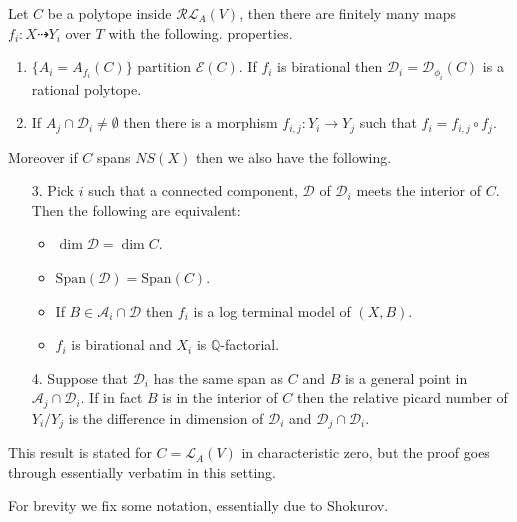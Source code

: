 	\begin{theorem}\label{assumptions}\cite[Theorem 3.3]{hacon2009sarkisov}
		Let $C$ be a polytope inside $\mathcal{RL}_{A}(V)$, then there are finitely many maps $f_{i}:X \dashrightarrow Y_{i}$ over $T$ with the following. properties.
		
		\begin{enumerate}
			\item $\{A_{i}=A_{f_{i}}(C)\}$ partition $\mathcal{E}(C)$. If $f_{i}$ is birational then $\mathcal{D}_{i}=\mathcal{D}_{\phi_{i}}(C)$ is a rational polytope.
			\item If $A_{j} \cap \mathcal{D}_{i} \neq \emptyset$ then there is a morphism $f_{i,j}:Y_{i} \to Y_{j}$ such that $f_{i}=f_{i,j} \circ f_{j}$.
		\end{enumerate}
		
		Moreover if $C$ spans $NS(X)$ then we also have the following.
		
		\begin{enumerate}
			\item[3.] Pick $i$ such that a connected component, $\mathcal{D}$ of $\mathcal{D}_{i}$ meets the interior of $C$. Then the following are equivalent:
			\begin{itemize}
				\item $\dim \mathcal{D}= \dim C$.
				\item $\text{Span}(\mathcal{D})=\text{Span}(C)$.
				\item If $B \in \mathcal{A}_{i} \cap \mathcal{D}$ then $f_{i}$ is a log terminal model of $(X,B)$.
				\item $f_{i}$ is birational and $X_{i}$ is $\mathbb{Q}$-factorial.
			\end{itemize} 
			
			\item[4.] Suppose that $\mathcal{D}_{i}$ has the same span as $C$ and $B$ is a general point in $\mathcal{A}_{j} \cap \mathcal{D}_{i}$. If in fact $B$ is in the interior of $C$ then the relative picard number of $Y_{i}/Y_{j}$ is the difference in dimension of $\mathcal{D}_{i}$ and $\mathcal{D}_{j} \cap \mathcal{D}_{i}$. 
			
		\end{enumerate}
	\end{theorem}
	
	This result is stated for $C=\mathcal{L}_{A}(V)$ in characteristic zero, but the proof goes through essentially verbatim in this setting.
	
	For brevity we fix some notation, essentially due to Shokurov.
	
